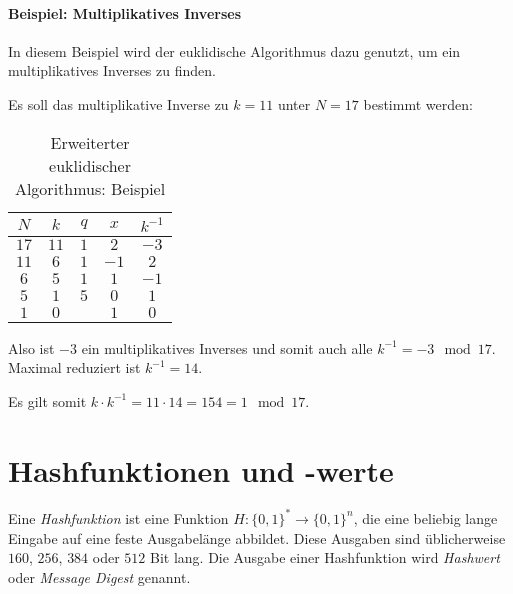             \paragraph{Beispiel: Multiplikatives Inverses}
	            In diesem Beispiel wird der euklidische Algorithmus dazu genutzt, um ein multiplikatives Inverses zu finden.
	            
	            Es soll das multiplikative Inverse zu \(k = 11\) unter \(N = 17\) bestimmt werden:
	            \begin{table}[H]
	            	\centering
	            	\begin{tabular}{|c|c|c|c|c|}
	            		\hline
	            		      \(N\)       & \(k\)  & \(q\) &       \(x\)       &     \(k^{-1}\)     \\ \hline
	            		     \(17\)       & \(11\) & \(1\) & \underline{\(2\)} & \underline{\(-3\)} \\ \hline
	            		     \(11\)       & \(6\)  & \(1\) &      \(-1\)       &       \(2\)        \\ \hline
	            		      \(6\)       & \(5\)  & \(1\) &       \(1\)       &       \(-1\)       \\ \hline
	            		      \(5\)       & \(1\)  & \(5\) &       \(0\)       &       \(1\)        \\ \hline
	            		\underline{\(1\)} & \(0\)  & \(\)  &       \(1\)       &       \(0\)        \\ \hline
	            	\end{tabular}
	            	\caption{Erweiterter euklidischer Algorithmus: Beispiel}
	            \end{table}
	            Also ist \(-3\) ein multiplikatives Inverses und somit auch alle \(k^{-1} = -3 \mod 17\). Maximal reduziert ist \(k^{-1}=14\).
	            
	            Es gilt somit \(k \cdot k^{-1} = 11 \cdot 14 = 154 = 1 \mod 17\).

    \section{Hashfunktionen und -werte}
        Eine \textit{Hashfunktion} ist eine Funktion \( H : \{0,1\}^* \rightarrow \{0,1\}^n \), die eine beliebig lange Eingabe auf eine feste Ausgabelänge abbildet. Diese Ausgaben sind üblicherweise \(160\), \(256\), \(384\) oder \(512\) Bit lang. Die Ausgabe einer Hashfunktion wird \textit{Hashwert} oder \textit{Message Digest} genannt.
        
